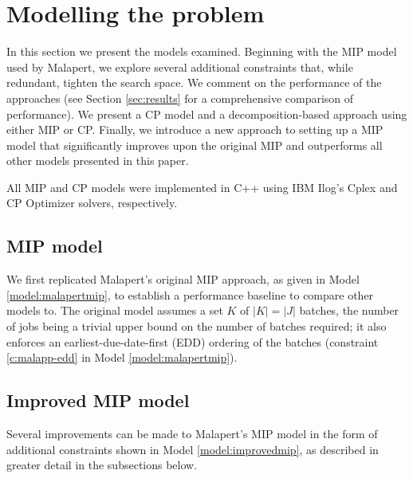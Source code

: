 \documentclass[13pt, letterpaper, oneside]{book}
\begin{document}

\chapter{Modelling the problem} 
In this section we present the models examined.
Beginning with the MIP model used by Malapert, we explore several additional
constraints that, while redundant, tighten the search space. We comment on the
performance of the approaches (see Section \ref{sec:results} for a
comprehensive comparison of performance). We present a CP model and a
decomposition-based approach using either MIP or CP. Finally, we introduce a new
approach to setting up a MIP model that significantly improves upon the original
MIP and outperforms all other models presented in this paper.

All MIP and CP models were implemented in C++ using IBM Ilog's Cplex and CP
Optimizer solvers, respectively.

\section{MIP model}\label{sec:malapertmipmodel}
We first replicated Malapert's original MIP approach, as given in Model
\ref{model:malapertmip}, to establish a performance baseline to compare other
models to. The original model assumes a
set $K$ of $|K| = |J|$ batches, the number of jobs being a trivial upper bound
on the number of batches required; it also enforces an earliest-due-date-first
(EDD) ordering of the batches (constraint \eqref{c:malapp-edd} in Model
\ref{model:malapertmip}).

\section{Improved MIP model}\label{sec:improvedmipmodel}
Several improvements can be made to Malapert's MIP model in the form of
additional constraints shown in Model \ref{model:improvedmip}, as  
described in greater detail in the subsections below.
\end{document}
